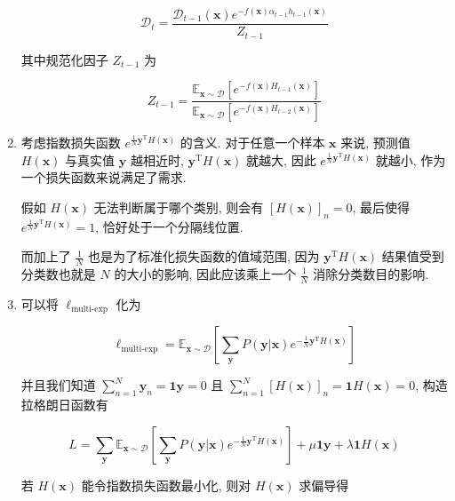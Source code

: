\documentclass[answers]{exam}  %
\begin{document}
\begin{questions}
\begin{solution}
\begin{enumerate}
            $$
              \mathcal{D}_{t} = \frac{\mathcal{D}_{t-1}(\bm{x})e^{-f(\bm{x})\alpha_{t-1}h_{t-1}(\bm{x})}}{Z_{t-1}}
            $$

            其中规范化因子 $Z_{t-1}$ 为

            $$
              Z_{t-1} = \frac{\mathbb{E}_{\bm{x}\sim \mathcal{D}}[e^{-f(\bm{x})H_{t-1}(\bm{x})}]}{\mathbb{E}_{\bm{x}\sim \mathcal{D}}[e^{-f(\bm{x})H_{t-2}(\bm{x})}]}
            $$

      \item

            考虑指数损失函数 $e^{\frac{1}{N}\bm{y}^{\mathrm{T}}H(\bm{x})}$ 的含义. 对于任意一个样本 $\bm{x}$ 来说, 预测值 $H(\bm{x})$ 与真实值 $\bm{y}$ 越相近时, $\bm{y}^{\mathrm{T}}H(\bm{x})$ 就越大, 因此 $e^{\frac{1}{N}\bm{y}^{\mathrm{T}}H(\bm{x})}$ 就越小, 作为一个损失函数来说满足了需求.

            假如 $H(\bm{x})$ 无法判断属于哪个类别, 则会有 $[H(\bm{x})]_{n} = 0$, 最后使得 $e^{\frac{1}{N}\bm{y}^{\mathrm{T}}H(\bm{x})}=1$, 恰好处于一个分隔线位置.

            而加上了 $\frac{1}{N}$ 也是为了标准化损失函数的值域范围, 因为 $\bm{y}^{\mathrm{T}}H(\bm{x})$ 结果值受到分类数也就是 $N$ 的大小的影响, 因此应该乘上一个 $\frac{1}{N}$ 消除分类数目的影响.

      \item

            可以将 $\ell_{\text{multi-exp}}$ 化为

            $$
              \ell_{\text{multi-exp}} = \mathbb{E}_{\bm{x}\sim \mathcal{D}}[\sum_{\bm{y}}P(\bm{y}|\bm{x})e^{-\frac{1}{N}\bm{y}^{\mathrm{T}}H(\bm{x})}]
            $$

            并且我们知道 $\sum_{n=1}^{N}\bm{y}_{n}=\bm{1}\bm{y}=0$ 且 $\sum_{n=1}^{N}[H(\bm{x})]_{n}=\bm{1}H(\bm{x})=0$, 构造拉格朗日函数有

            $$
              L = \sum_{\bm{y}}\mathbb{E}_{\bm{x}\sim \mathcal{D}}[\sum_{\bm{y}}P(\bm{y}|\bm{x})e^{-\frac{1}{N}\bm{y}^{\mathrm{T}}H(\bm{x})}] + \mu \bm{1}\bm{y} + \lambda \bm{1}H(\bm{x})
            $$

            若 $H(\bm{x})$ 能令指数损失函数最小化, 则对 $H(\bm{x})$ 求偏导得


\end{enumerate}
\end{solution}
\end{questions}
\end{document}
